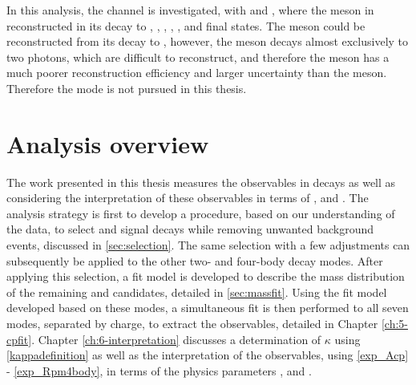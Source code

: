 In this analysis, the \decay{\Bm}{\D\Kstarm} channel is investigated, with \decay{\Kstarm}{\KS\pim} and \decay{\KS}{\pim\pip}, where the \Dz meson in reconstructed in its decay to \Km\pip, \Kp\Km, \pip\pim, \Kp\pim, \Km\pip\pim\pip, \pip\pim\pip\pim and \Kp\pim\pip\pim final states. The \Kstarm meson could be reconstructed from its decay to \Km\piz, however, the \piz meson decays almost exclusively to two photons, which are difficult to reconstruct, and therefore the \piz meson has a much poorer reconstruction efficiency and larger uncertainty than the \KS meson. Therefore the \Km\piz mode is not pursued in this thesis.

\section{Analysis overview}

The work presented in this thesis measures the \CP observables in \decay{\Bm}{\D\Kstarm} decays as well as considering the interpretation of these observables in terms of \rb, \deltab and \Pgamma. The analysis strategy is first to develop a procedure, based on our understanding of the data, to select \decay{\Bm}{\D(\Km\pip)\Kstarm} and \kpipipi signal decays while removing unwanted background events, discussed in \sect\ref{sec:selection}. The same selection with a few adjustments can subsequently be applied to the other two- and four-body \D decay modes. After applying this selection, a fit model is developed to describe the \B mass distribution of the remaining \decay{\Bm}{\D(\Km\pip)\Kstarm} and \kpipipi candidates, detailed in \sect\ref{sec:massfit}. Using the fit model developed based on these modes, a simultaneous fit is then performed to all seven \D modes, separated by \B charge, to extract the \CP observables, detailed in Chapter \ref{ch:5-cpfit}. Chapter \ref{ch:6-interpretation} discusses a determination of $\kappa$ using \eqn\ref{kappadefinition} as well as the interpretation of the \CP observables, using \eqns\ref{exp_Acp} - \ref{exp_Rpm4body}, in terms of the physics parameters \rb, \deltab and \Pgamma.